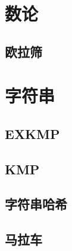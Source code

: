 \documentclass{article}
\begin{document}
\begin{multicols*}{2}
\section{数论}
\subsection{欧拉筛}

\section{字符串}
\subsection{EXKMP}

\subsection{KMP}

\subsection{字符串哈希}

\subsection{马拉车}

\end{multicols*}
\end{document}
